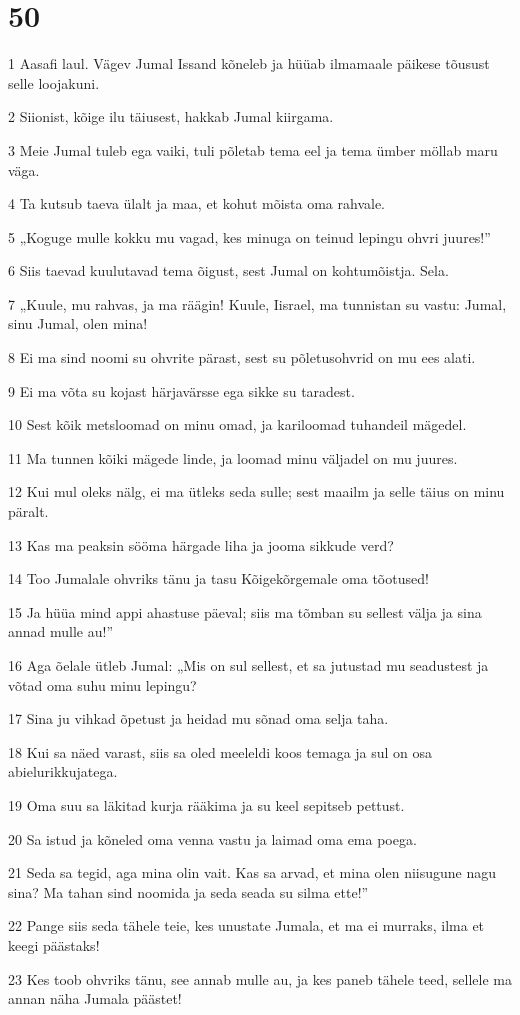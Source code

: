 \chapter{50}

\par 1 Aasafi laul. Vägev Jumal Issand kõneleb ja hüüab ilmamaale päikese tõusust selle loojakuni.
\par 2 Siionist, kõige ilu täiusest, hakkab Jumal kiirgama.
\par 3 Meie Jumal tuleb ega vaiki, tuli põletab tema eel ja tema ümber möllab maru väga.
\par 4 Ta kutsub taeva ülalt ja maa, et kohut mõista oma rahvale.
\par 5 „Koguge mulle kokku mu vagad, kes minuga on teinud lepingu ohvri juures!”
\par 6 Siis taevad kuulutavad tema õigust, sest Jumal on kohtumõistja. Sela.
\par 7 „Kuule, mu rahvas, ja ma räägin! Kuule, Iisrael, ma tunnistan su vastu: Jumal, sinu Jumal, olen mina!
\par 8 Ei ma sind noomi su ohvrite pärast, sest su põletusohvrid on mu ees alati.
\par 9 Ei ma võta su kojast härjavärsse ega sikke su taradest.
\par 10 Sest kõik metsloomad on minu omad, ja kariloomad tuhandeil mägedel.
\par 11 Ma tunnen kõiki mägede linde, ja loomad minu väljadel on mu juures.
\par 12 Kui mul oleks nälg, ei ma ütleks seda sulle; sest maailm ja selle täius on minu päralt.
\par 13 Kas ma peaksin sööma härgade liha ja jooma sikkude verd?
\par 14 Too Jumalale ohvriks tänu ja tasu Kõigekõrgemale oma tõotused!
\par 15 Ja hüüa mind appi ahastuse päeval; siis ma tõmban su sellest välja ja sina annad mulle au!”
\par 16 Aga õelale ütleb Jumal: „Mis on sul sellest, et sa jutustad mu seadustest ja võtad oma suhu minu lepingu?
\par 17 Sina ju vihkad õpetust ja heidad mu sõnad oma selja taha.
\par 18 Kui sa näed varast, siis sa oled meeleldi koos temaga ja sul on osa abielurikkujatega.
\par 19 Oma suu sa läkitad kurja rääkima ja su keel sepitseb pettust.
\par 20 Sa istud ja kõneled oma venna vastu ja laimad oma ema poega.
\par 21 Seda sa tegid, aga mina olin vait. Kas sa arvad, et mina olen niisugune nagu sina? Ma tahan sind noomida ja seda seada su silma ette!”
\par 22 Pange siis seda tähele teie, kes unustate Jumala, et ma ei murraks, ilma et keegi päästaks!
\par 23 Kes toob ohvriks tänu, see annab mulle au, ja kes paneb tähele teed, sellele ma annan näha Jumala päästet!

